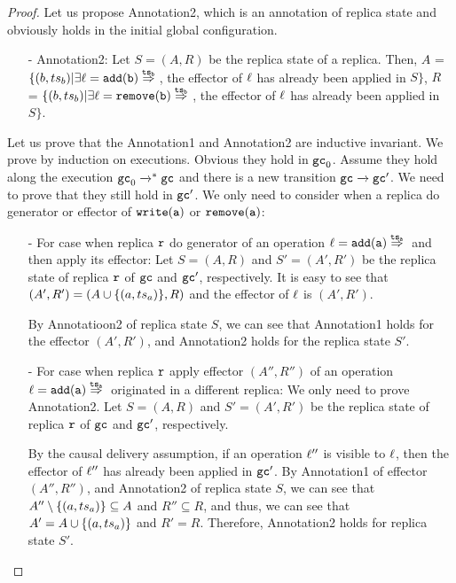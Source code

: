 \begin {proof}

Let us propose Annotation2, which is an annotation of replica state and obviously holds in the initial global configuration.

\begin{itemize}
\setlength{\itemsep}{0.5pt}
\item[-] Annotation2: Let $S = (A,R)$ be the replica state of a replica. Then, $A$ =  $\{ (b,\ats_b) \vert \exists \alabel = \alabellongind[{\tt add}]{b}{}{\ats_b}{}$, the effector of $\ell$ has already been applied in $S \}$,
    $R$ =  $\{ (b,\ats_b) \vert \exists \alabel = \alabellongind[{\tt remove}]{b}{}{\ats_b}{}$, the effector of $\ell$ has already been applied in $S \}$.
\end{itemize}

Let us prove that the Annotation1 and Annotation2 are inductive invariant. We prove by induction on executions. Obvious they hold in $\mathtt{gc}_0$. Assume they hold along the execution $\mathtt{gc}_0 \xrightarrow{}^* \mathtt{gc}$ and there is a new transition $\mathtt{gc} \xrightarrow{} \mathtt{gc}'$. We need to prove that they still hold in $\mathtt{gc}'$. We only need to consider when a replica do generator or effector of $\alabelshort[{\tt write}]{a}$ or $\alabelshort[{\tt remove}]{a}$:

\begin{itemize}
\setlength{\itemsep}{0.5pt}
\item[-] For case when replica $\mathtt{r}$ do generator of an operation $\alabel = \alabellongind[{\tt add}]{a}{}{\ats_a}{}$ and then apply its effector: Let $S=(A,R)$ and $S'=(A',R')$ be the replica state of replica $\mathtt{r}$ of $\mathtt{gc}$ and $\mathtt{gc}'$, respectively. It is easy to see that $(A',R') = (A \cup \{ (a,ts_a) \},R)$ and the effector of $\ell$ is $(A',R')$.

    By Annotatioon2 of replica state $S$, we can see that Annotation1 holds for the effector $(A',R')$, and Annotation2 holds for the replica state $S'$.

\item[-] For case when replica $\mathtt{r}$ apply effector $(A'',R'')$ of an operation $\alabel = \alabellongind[{\tt add}]{a}{}{\ats_a}{}$ originated in a different replica: We only need to prove Annotation2. Let $S=(A,R)$ and $S'=(A',R')$ be the replica state of replica $\mathtt{r}$ of $\mathtt{gc}$ and $\mathtt{gc}'$, respectively.

    By the causal delivery assumption, %
    if an operation $\ell''$ is visible to $\ell$, then the effector of $\ell''$ has already been applied in $\mathtt{gc}'$. By Annotation1 of effector $(A'',R'')$, and Annotation2 of replica state $S$, we can see that $A'' \setminus \{ (a,ts_a) \} \subseteq A$ and $R'' \subseteq R$, and thus, we can see that $A' = A \cup \{ (a,ts_a) \}$ and $R' = R$. Therefore, Annotation2 holds for replica state $S'$.


\end{itemize}
\end{proof}
